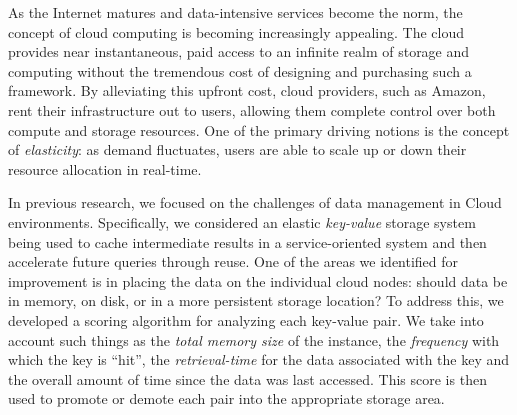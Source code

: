 As the Internet matures and data-intensive services become the norm, the
concept of cloud computing is becoming increasingly appealing. The cloud
provides near instantaneous, paid access to an infinite realm of storage and
computing without the tremendous cost of designing and purchasing such a
framework. By alleviating this upfront cost, cloud providers, such as Amazon,
rent their infrastructure out to users, allowing them complete control over
both compute and storage resources. One of the primary driving notions is the
concept of \emph{elasticity}: as demand fluctuates, users are able to scale up
or down their resource allocation in real-time.

In previous research, we focused on the challenges of data management in Cloud
environments. Specifically, we considered an elastic \emph{key-value} storage
system being used to cache intermediate results in a service-oriented system
and then accelerate future queries through reuse. One of the areas we
identified for improvement is in placing the data on the individual cloud
nodes: should data be in memory, on disk, or in a more persistent storage
location? To address this, we developed a scoring algorithm for analyzing each
key-value pair. We take into account such things as the \emph{total memory
size} of the instance, the \emph{frequency} with which the key is ``hit'', the
\emph{retrieval-time} for the data associated with the key and the overall
amount of time since the data was last accessed. This score is then used to
promote or demote each pair into the appropriate storage area.
